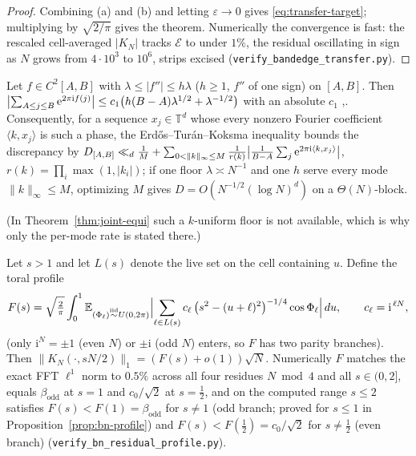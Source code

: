 \begin{proof}
Combining (a) and (b) and letting $\varepsilon\to0$ gives \eqref{eq:transfer-target}; multiplying by
$\sqrt{2/\pi}$ gives the theorem. Numerically the convergence is fast: the rescaled cell-averaged $|K_N|$
tracks $\mathcal E$ to under $1\%$, the residual oscillating in sign as $N$ grows from $4\cdot10^3$ to $10^6$,
strips excised (\texttt{verify\_bandedge\_transfer.py}).
\end{proof}

\begin{lemma}\label{lem:vdc-explicit}
Let $f\in C^2[A,B]$ with $\lambda\le|f''|\le h\lambda$ ($h\ge1$, $f''$ of one sign) on $[A,B]$. Then
$\bigl|\sum_{A\le j\le B}\mathrm{e}^{2\pi\mathrm i f(j)}\bigr|\le c_1\bigl(h(B-A)\lambda^{1/2}+\lambda^{-1/2}\bigr)$ with
an absolute $c_1$ \cite[Ch.~3]{Montgomery},\cite[Ch.~2]{GrahamKolesnik}. Consequently, for a sequence
$x_j\in\mathbb T^d$ whose every nonzero Fourier coefficient $\langle k,x_j\rangle$ is such a phase, the
Erd\H{o}s--Tur\'an--Koksma inequality \cite[Ch.~2, Thm.~2.5]{KN} bounds the discrepancy by
$D_{[A,B]}\ll_d \tfrac1M+\sum_{0<\|k\|_\infty\le M}\tfrac1{r(k)}\bigl|\tfrac1{B-A}\sum_j\mathrm{e}^{2\pi\mathrm i\langle k,x_j\rangle}\bigr|$,
$r(k)=\prod_i\max(1,|k_i|)$; if one floor $\lambda\asymp N^{-1}$ and one $h$ serve every mode $\|k\|_\infty\le M$,
optimizing $M$ gives $D=O(N^{-1/2}(\log N)^d)$ on a $\Theta(N)$-block.
\end{lemma}

\noindent (In Theorem~\ref{thm:joint-equi} such a $k$-uniform floor is not available, which is why only the
per-mode rate is stated there.)

\begin{proposition}\label{prop:multicopy}
Let $s>1$ and let $L(s)$ denote the live set on the cell containing $u$. Define the toral profile
\begin{equation}\label{eq:Fmulti}
  F(s)=\sqrt{\tfrac2{\pi}}\int_0^1
   \mathbb E_{(\Phi_\ell)\stackrel{\mathrm{iid}}\sim U(0,2\pi)}
   \Bigl|\sum_{\ell\in L(s)}c_\ell\,\bigl(s^2-(u+\ell)^2\bigr)^{-1/4}\cos\Phi_\ell\Bigr|\,du,\qquad
   c_\ell=\mathrm i^{\,\ell N},
\end{equation}
(only $\mathrm i^{N}=\pm1$ (even $N$) or $\pm\mathrm i$ (odd $N$) enters, so $F$ has two parity branches).
Then $\|K_N(\cdot,sN/2)\|_1=(F(s)+o(1))\sqrt N$. Numerically $F$ matches the exact FFT $\ell^1$ norm to $0.5\%$
across all four residues $N\bmod4$ and all $s\in(0,2]$, equals $\beta_{\mathrm{odd}}$ at $s=1$ and
$c_0/\sqrt2$ at $s=\tfrac12$, and on the computed range $s\le2$ satisfies $F(s)<F(1)=\beta_{\mathrm{odd}}$ for
$s\ne1$ (odd branch; proved for $s\le1$ in Proposition~\ref{prop:bn-profile}) and $F(s)<F(\tfrac12)=c_0/\sqrt2$
for $s\ne\tfrac12$ (even branch) (\texttt{verify\_bn\_residual\_profile.py}).
\end{proposition}

